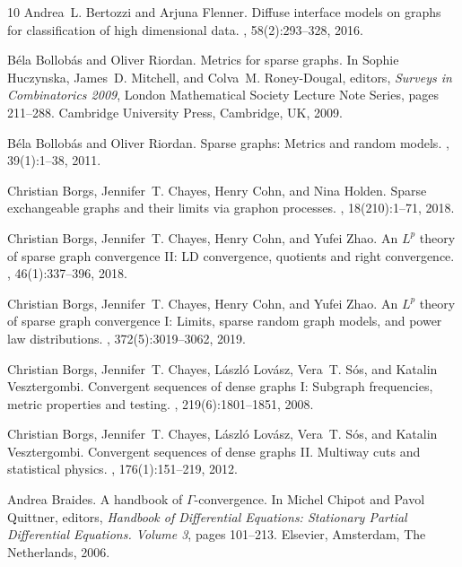 \documentclass[11pt]{amsart}
\numberwithin{equation}{section}
\begin{document}
\begin{thebibliography}{10}
Andrea~L. Bertozzi and Arjuna Flenner.
\newblock Diffuse interface models on graphs for classification of high
  dimensional data.
, 58(2):293--328, 2016.

B\'{e}la Bollob\'{a}s and Oliver Riordan.
\newblock Metrics for sparse graphs.
\newblock In Sophie Huczynska, James~D. Mitchell, and Colva~M. Roney-Dougal,
  editors, {\em Surveys in Combinatorics 2009}, London Mathematical Society
  Lecture Note Series, pages 211--288. Cambridge University Press, Cambridge,
  UK, 2009.

B{\'e}la Bollob{\'a}s and Oliver Riordan.
\newblock Sparse graphs: {M}etrics and random models.
, 39(1):1--38, 2011.

Christian Borgs, Jennifer~T. Chayes, Henry Cohn, and Nina Holden.
\newblock Sparse exchangeable graphs and their limits via graphon processes.
, 18(210):1--71, 2018.

Christian Borgs, Jennifer~T. Chayes, Henry Cohn, and Yufei Zhao.
\newblock An {$L^p$} theory of sparse graph convergence {II}: {LD} convergence,
  quotients and right convergence.
, 46(1):337--396, 2018.

Christian Borgs, Jennifer~T. Chayes, Henry Cohn, and Yufei Zhao.
\newblock An {$L^p$} theory of sparse graph convergence {I}: {L}imits, sparse
  random graph models, and power law distributions.
, 372(5):3019--3062, 2019.

Christian Borgs, Jennifer~T. Chayes, L{\'a}szl{\'o} Lov{\'a}sz, Vera~T.
  S{\'o}s, and Katalin Vesztergombi.
\newblock Convergent sequences of dense graphs {I}: {S}ubgraph frequencies,
  metric properties and testing.
, 219(6):1801--1851, 2008.

Christian Borgs, Jennifer~T. Chayes, L{\'a}szl{\'o} Lov{\'a}sz, Vera~T.
  S{\'o}s, and Katalin Vesztergombi.
\newblock Convergent sequences of dense graphs {II}. {M}ultiway cuts and
  statistical physics.
, 176(1):151--219, 2012.

Andrea Braides.
\newblock A handbook of {$\Gamma$}-convergence.
\newblock In Michel Chipot and Pavol Quittner, editors, {\em Handbook of
  Differential Equations: Stationary Partial Differential Equations. Volume 3},
  pages 101--213. Elsevier, Amsterdam, The Netherlands, 2006.


\end{thebibliography}
\end{document}
